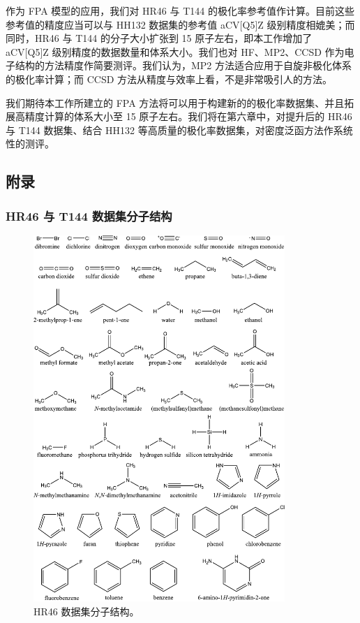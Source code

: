 作为 FPA 模型的应用，我们对 HR46 与 T144 的极化率参考值作计算。目前这些参考值的精度应当可以与 HH132 数据集的参考值 aCV[Q5]Z 级别精度相媲美；而同时，HR46 与 T144 的分子大小扩张到 15 原子左右，即本工作增加了 aCV[Q5]Z 级别精度的数据数量和体系大小。我们也对 HF、MP2、CCSD 作为电子结构的方法精度作简要测评。我们认为，MP2 方法适合应用于自旋非极化体系的极化率计算；而 CCSD 方法从精度与效率上看，不是非常吸引人的方法。

我们期待本工作所建立的 FPA 方法将可以用于构建新的的极化率数据集、并且拓展高精度计算的体系大小至 15 原子左右。我们将在\alert{第六章}中，对提升后的 HR46 与 T144 数据集、结合 HH132 等高质量的极化率数据集，对密度泛函方法作系统性的测评。

\subsection{附录}

\subsubsection{HR46 与 T144 数据集分子结构}

\begin{figure}[H]
    \centering
    \caption{HR46 数据集分子结构。}
    \label{fig.fig-s1}
    \includegraphics[width=0.85\textwidth]{assets/fig-s1.pdf}
\end{figure}

